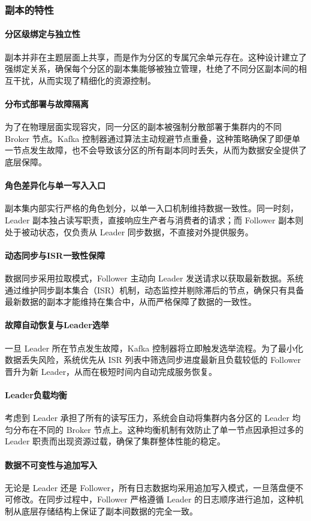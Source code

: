 		\subsubsection{副本的特性} \paragraph{分区级绑定与独立性} 副本并非在主题层面上共享，而是作为分区的专属冗余单元存在。这种设计建立了强绑定关系，确保每个分区的副本集能够被独立管理，杜绝了不同分区副本间的相互干扰，从而实现了精细化的资源控制。 \paragraph{分布式部署与故障隔离} 为了在物理层面实现容灾，同一分区的副本被强制分散部署于集群内的不同 Broker 节点。Kafka 控制器通过算法主动规避节点重叠，这种策略确保了即便单一节点发生故障，也不会导致该分区的所有副本同时丢失，从而为数据安全提供了底层保障。 \paragraph{角色差异化与单一写入入口} 副本集内部实行严格的角色划分，以单一入口机制维持数据一致性。同一时刻，Leader 副本独占读写职责，直接响应生产者与消费者的请求；而 Follower 副本则处于被动状态，仅负责从 Leader 同步数据，不直接对外提供服务。 \paragraph{动态同步与ISR一致性保障} 数据同步采用拉取模式，Follower 主动向 Leader 发送请求以获取最新数据。系统通过维护同步副本集合（ISR）机制，动态监控并剔除滞后的节点，确保只有具备最新数据的副本才能维持在集合中，从而严格保障了数据的一致性。 \paragraph{故障自动恢复与Leader选举} 一旦 Leader 所在节点发生故障，Kafka 控制器将立即触发选举流程。为了最小化数据丢失风险，系统优先从 ISR 列表中筛选同步进度最新且负载较低的 Follower 晋升为新 Leader，从而在极短时间内自动完成服务恢复。 \paragraph{Leader负载均衡} 考虑到 Leader 承担了所有的读写压力，系统会自动将集群内各分区的 Leader 均匀分布在不同的 Broker 节点上。这种均衡机制有效防止了单一节点因承担过多的 Leader 职责而出现资源过载，确保了集群整体性能的稳定。 \paragraph{数据不可变性与追加写入} 无论是 Leader 还是 Follower，所有日志数据均采用追加写入模式，一旦落盘便不可修改。在同步过程中，Follower 严格遵循 Leader 的日志顺序进行追加，这种机制从底层存储结构上保证了副本间数据的完全一致。
